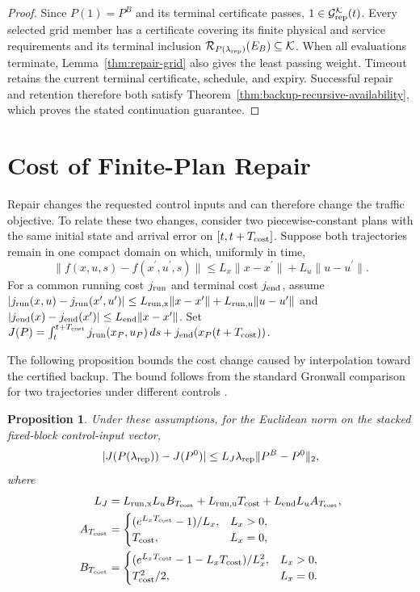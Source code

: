 \documentclass[preprint,12pt]{elsarticle}
\theoremstyle{definition}
\theoremstyle{plain}
\newtheorem{proposition}{Proposition}
\theoremstyle{definition}
\theoremstyle{plain}
\begin{document}
\begin{proof}
Since $P(1)=P^B$ and its terminal certificate passes,
$1\in\mathcal G_{\rm rep}^{\mathcal K}(t)$. Every selected grid
member has a certificate covering its finite physical and service
requirements and its terminal inclusion
$\mathcal R_{P(\lambda_{\rm rep})}(E_B)\subseteq\mathcal K$.
When all evaluations terminate, Lemma~\ref{thm:repair-grid} also gives
the least passing weight. Timeout retains the current terminal
certificate, schedule, and expiry. Successful repair and retention
therefore both satisfy Theorem~\ref{thm:backup-recursive-availability},
which proves the stated continuation guarantee.
\end{proof}

\section{Cost of Finite-Plan Repair}
\label{sec:repair-cost-bound}
\label{app:repair-cost}

Repair changes the requested control inputs and can therefore change the
traffic objective. To relate these two changes, consider two piecewise-constant
plans with the same initial state and arrival error on $[t,t+T_{\rm cost}]$.
Suppose both trajectories remain in one compact
domain on which, uniformly in time,
\[
\|f(x,u,s)-f(x^{\prime},u^{\prime},s)\|
\le L_x\|x-x^{\prime}\|+L_u\|u-u^{\prime}\|.
\]
For a common running cost $j_{\rm run}$ and terminal cost $j_{\rm end}$, assume
$|j_{\rm run}(x,u)-j_{\rm run}(x^{\prime},u^{\prime})|\le L_{\rm run,x}\|x-x^{\prime}\|+
L_{\rm run,u}\|u-u^{\prime}\|$ and $|j_{\rm end}(x)-j_{\rm end}(x^{\prime})|\le L_{\rm end}\|x-x^{\prime}\|$.
Set $J(P)=\int_t^{t+T_{\rm cost}}j_{\rm run}(x_P,u_P)\,ds+j_{\rm end}(x_P(t+T_{\rm cost}))$.

The following proposition bounds the cost change caused by interpolation
toward the certified backup. The bound follows from the standard
Gronwall comparison for two trajectories under different controls
\cite{khalil2002nonlinear}.

\begin{proposition}
\label{prop:repair-cost}
Under these assumptions, for the Euclidean norm on the stacked fixed-block
control-input vector,
\begin{equation}
|J(P(\lambda_{\rm rep}))-J(P^0)|
\le L_J\lambda_{\rm rep}\|P^B-P^0\|_2,
\label{eq:repair-cost-bound}
\end{equation}
where
\begin{align*}
L_J&=L_{\rm run,x}L_u B_{T_{\rm cost}}+L_{\rm run,u}T_{\rm cost}+L_{\rm end}L_u A_{T_{\rm cost}},\\
A_{T_{\rm cost}}&=\begin{cases}(e^{L_xT_{\rm cost}}-1)/L_x,&L_x>0,\\T_{\rm cost},&L_x=0,\end{cases}\\
B_{T_{\rm cost}}&=\begin{cases}(e^{L_xT_{\rm cost}}-1-L_xT_{\rm cost})/L_x^2,&L_x>0,\\T_{\rm cost}^2/2,&L_x=0.\end{cases}
\end{align*}
\end{proposition}
\end{document}
